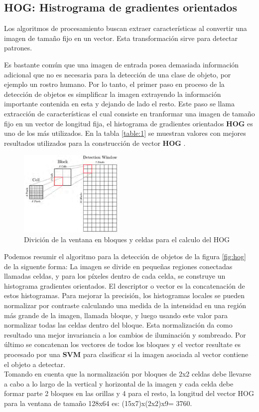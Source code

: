 \documentclass{article}
\begin{document}
\subsection*{HOG: Histrograma de gradientes orientados}
Los  algoritmos  de  procesamiento  buscan  extraer  características  al  convertir  una  imagen  de  tamaño  fijo  en  un  vector.  Esta  transformación  sirve  para  detectar  patrones.  

Es bastante común que una imagen de entrada posea demasiada información adicional que no es necesaria para la detección de una clase de objeto, por ejemplo un rostro humano. Por lo tanto, el primer paso en proceso de la detección de objetos  es  simplificar  la  imagen  extrayendo  la  información  importante contenida en esta y dejando de lado el resto. Este paso se llama extracción de características el cual consiste en tranformar una imagen de tamaño fijo en un vector de longitud fija, el histograma  de  gradientes  orientados \textbf{HOG} es uno de los más utilizados. En la tabla \ref{table:1} se muestran valores con mejores resultados utilizados para la construcción de vector \textbf{HOG} \cite{dalal-triggs}. \\

\begin{figure}
\centering
\includegraphics[width=5cm]{celda-bloque-ventana.png}
\caption{Divición de la ventana en bloques y celdas para el calculo del HOG}
\label{fig:celda-bloque-venana}
\end{figure}

Podemos resumir el algoritmo para la detección de objetos de la figura \ref{fig:hog} de la siguente forma: La imagen se divide en pequeñas regiones conectadas llamadas celdas, y para los píxeles dentro de cada celda, se construye un histograma gradientes orientados. El descriptor o vector es la concatenación de estos histogramas. Para mejorar la precisión, los histogramas locales se pueden normalizar por contraste calculando una medida de la intensidad en una región más grande de la imagen, llamada bloque, y luego usando este valor para normalizar todas las celdas dentro del bloque. Esta normalización da como resultado una mejor invariancia a los cambios de iluminación y sombreado. Por último se concatenan los vectores de todos los bloques y el vector resultate es procesado por una \textbf{SVM} para clasificar si la imagen asociada al vector contiene el objeto a detectar.\\
Tomando en cuenta que la normalización por bloques de 2x2 celdas debe llevarse a cabo a lo largo de la vertical y horizontal de la imagen y cada celda debe formar parte 2 bloques en las orillas y 4 para el resto, la longitud del vector HOG para la ventana de tamaño 128x64 es: (15x7)x(2x2)x9= 3760.
\end{document}

